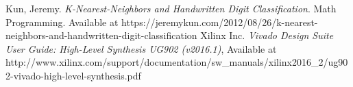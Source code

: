 \documentclass[paper=letter, fontsize=10pt]{scrartcl} %
\numberwithin{equation}{section} %
\numberwithin{figure}{section} %
\numberwithin{table}{section} %
\begin{document}
\begin{thebibliography}{3}

Kun, Jeremy. \emph{K-Nearest-Neighbors and Handwritten Digit Classification}. Math Programming. Available at https://jeremykun.com/2012/08/26/k-nearest-neighbors-and-handwritten-digit-classification
Xilinx Inc. \emph{Vivado Design Suite User Guide: High-Level Synthesis UG902 (v2016.1)},
Available at http://www.xilinx.com/support/documentation/sw\_manuals/xilinx2016\_2/ug902-vivado-high-level-synthesis.pdf

\end{thebibliography}
\end{document}

